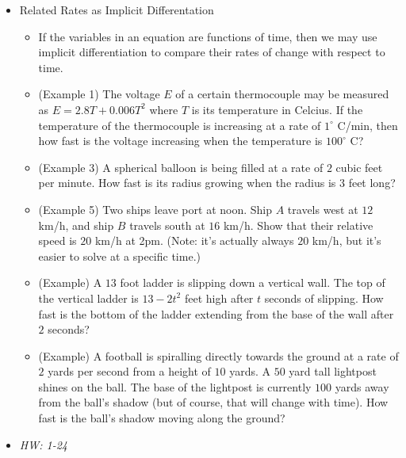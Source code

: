 \documentclass[11pt]{article}
\begin{document}
\begin{itemize}
\item Related Rates as Implicit Differentation
  \begin{itemize}
    \item If the variables in an equation are functions of time, then
          we may use implicit differentiation to compare their rates of
          change with respect to time.
    \item (Example 1) The voltage \(E\) of a certain thermocouple may
          be measured as \(E=2.8T+0.006 T^2\) where \(T\) is its temperature
          in Celcius. If the temperature of the thermocouple is increasing
          at a rate of \(1^\circ\) C/min, then how fast is the voltage
          increasing when the temperature is \(100^\circ\) C?
    \item (Example 3) A spherical balloon is being filled at a rate of
          \(2\) cubic feet per minute. How fast is its radius growing
          when the radius is \(3\) feet long?
    \item (Example 5) Two ships leave port at noon. Ship \(A\) travels
          west at \(12\) km/h, and ship \(B\) travels south at \(16\) km/h.
          Show that their relative speed is \(20\) km/h at 2pm.
          (Note: it's actually always \(20\) km/h, but it's easier to solve
          at a specific time.)
    \item (Example) A \(13\) foot ladder is slipping down a vertical wall.
          The top of the vertical ladder is \(13-2t^2\) feet high after \(t\)
          seconds of slipping. How fast is the bottom of the ladder extending
          from the base of the wall after \(2\) seconds?
    \item (Example) A football is spiralling directly towards the ground
          at a rate of \(2\) yards per second
          from a height of \(10\) yards. A \(50\) yard tall lightpost shines on
          the ball. The base of the lightpost is currently
          \(100\) yards away from
          the ball's shadow (but of course, that will change with
          time). How fast is the ball's shadow moving along the
          ground?
  \end{itemize}
\item\textit{
  HW: 1-24
}
\end{itemize}

\end{document}
